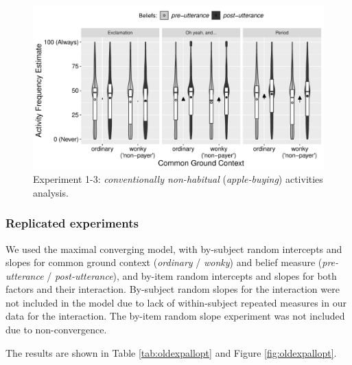 \documentclass{sp}\usepackage[]{graphicx}\usepackage[]{color}
\makeatletter
\def\maxwidth{ %
  \ifdim\Gin@nat@width>\linewidth
    \linewidth
  \else
    \Gin@nat@width
  \fi
}
\newenvironment{knitrout}{}{} %
\makeatother
\begin{document}
\begin{figure}\begin{center}
\begin{knitrout}
\color{fgcolor}
\includegraphics[width=\maxwidth]{figure/suppfig1-1} 

\end{knitrout}
\end{center}
\caption{Experiment 1-3: \textit{conventionally non-habitual} (\textit{apple-buying}) activities analysis.}
\label{fig:expallopt}
\end{figure}

\subsubsection{Replicated experiments}

We used the maximal converging model, with by-subject random intercepts and slopes for common ground context (\textit{ordinary} / \textit{wonky}) and belief measure (\textit{pre-utterance} / \textit{post-utterance}), and by-item random intercepts and slopes for both factors and their interaction. By-subject random slopes for the interaction were not included in the model due to lack of within-subject repeated measures in our data for the interaction. The by-item random slope experiment was not included due to non-convergence.

The results are shown in Table \ref{tab:oldexpallopt} and Figure \ref{fig:oldexpallopt}.
\end{document}
